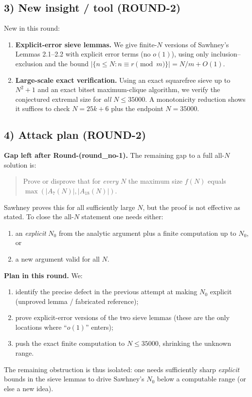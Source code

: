 \subsection*{3) New insight / tool (ROUND-2)}
New in this round:
\begin{enumerate}
\item \textbf{Explicit-error sieve lemmas.}  We give finite-$N$ versions of Sawhney's Lemmas 2.1--2.2 with explicit error terms (no $o(1)$), using only inclusion--exclusion and the bound $|\{n\le N:n\equiv r\!\!\pmod m\}|=N/m+O(1)$.
\item \textbf{Large-scale exact verification.}  Using an exact squarefree sieve up to $N^2+1$ and an exact bitset maximum-clique algorithm, we verify the conjectured extremal size for \emph{all $N\le 35000$}.  A monotonicity reduction shows it suffices to check $N=25k+6$ plus the endpoint $N=35000$.
\end{enumerate}

\subsection*{4) Attack plan (ROUND-2)}
\textbf{Gap left after Round-(round\_no-1).}
The remaining gap to a full all-$N$ solution is:
\begin{quote}
Prove or disprove that for \emph{every} $N$ the maximum size $f(N)$ equals $\max(|A_7(N)|,|A_{18}(N)|)$.
\end{quote}
Sawhney proves this for all sufficiently large $N$, but the proof is not effective as stated.
To close the all-$N$ statement one needs either:
\begin{enumerate}
\item an \emph{explicit} $N_0$ from the analytic argument plus a finite computation up to $N_0$, or
\item a new argument valid for all $N$.
\end{enumerate}
\textbf{Plan in this round.} We:
\begin{enumerate}
\item identify the precise defect in the previous attempt at making $N_0$ explicit (unproved lemma / fabricated reference);
\item prove explicit-error versions of the two sieve lemmas (these are the only locations where ``$o(1)$'' enters);
\item push the exact finite computation to $N\le 35000$, shrinking the unknown range.
\end{enumerate}
The remaining obstruction is thus isolated: one needs sufficiently sharp \emph{explicit} bounds in the sieve lemmas to drive Sawhney's $N_0$ below a computable range (or else a new idea).


